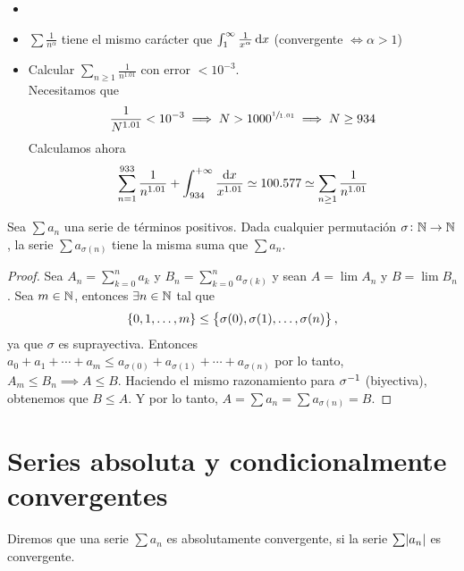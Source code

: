 \begin{example*}
    \begin{itemize}
        \item[]
        \item $\sum \frac{1}{n^\alpha}$ tiene el mismo carácter que
            $\int_{1}^{\infty} \frac{1}{x^\alpha} \dif x$ (convergente $\iff \alpha > 1$)
        \item Calcular $\sum\limits_{n\geq 1} \frac{1}{n^{1.01}}$ con error $< 10^{-3}$. \\
            Necesitamos que
            \[
                \frac{1}{N^{1.01}} < 10^{-3} \implies N > 1000^{\sfrac{1}{1.01}} \implies
                N \geq 934
            \]
            Calculamos ahora
            \[
                \sum_{n=1}^{933} \frac{1}{n^{1.01}} + \int_{934}^{+\infty}
                \frac{\dif x}{x^{1.01}} \simeq 100.577 \simeq\sum_{n\geq 1}\frac{1}{n^{1.01}}
            \]
    \end{itemize}
\end{example*}

\begin{prop}
    Sea $\sum a_n$ una serie de términos positivos. Dada cualquier permutación $\sigma
    \colon \mathbb{N} \to \mathbb{N}$, la serie $\sum a_{\sigma(n)}$ tiene la misma suma que $\sum a_n$.
\end{prop}

\begin{proof}
    Sea $A_n = \sum\limits_{k=0}^n a_k$ y $B_n = \sum\limits_{k=0}^n a_{\sigma(k)}$ y sean
    $A = \lim A_n$ y $B = \lim B_n$. Sea
    $m \in \mathbb{N}$, entonces $\exists n \in \mathbb{N}$ tal que
    \[
        \left\{0,1, \dots, m\right\} \leq \left\{\sigma(0), \sigma(1), \dots, \sigma(n)\right\},
    \]
    ya que $\sigma$ es suprayectiva. Entonces $a_0 + a_1 + \cdots + a_m \leq a_{\sigma(0)} +
    a_{\sigma(1)} + \cdots + a_{\sigma(n)}$ por lo tanto, $A_m \leq B_n \implies A \leq B$.
    Haciendo el mismo razonamiento para $\sigma^{-1}$ (biyectiva), obtenemos que $B \leq A$.
    Y por lo tanto, $A = \sum a_n = \sum a_{\sigma(n)} = B$.
\end{proof}

\section{Series absoluta y condicionalmente convergentes}

\begin{defi}
  Diremos que una serie $\sum a_n$ es absolutamente convergente, si la serie $\sum \abs{a_n}$ es convergente.
\end{defi}

